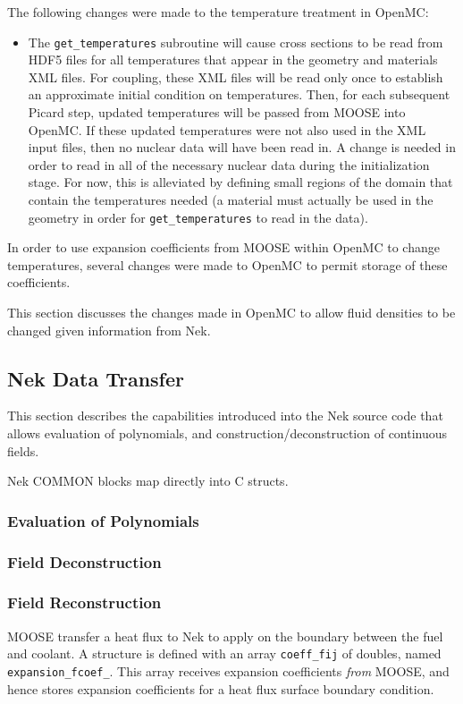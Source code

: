 \documentclass[10pt]{article}
\newcounter{subsubsubsection}[subsubsection]
\numberwithin{equation}{section} %
\begin{document}
The following changes were made to the temperature treatment in OpenMC:

\begin{itemize}
\item The {\tt get\_temperatures} subroutine will cause cross sections to be read from HDF5 files for all temperatures that appear in the geometry and materials XML files. For coupling, these XML files will be read only once to establish an approximate initial condition on temperatures. Then, for each subsequent Picard step, updated temperatures will be passed from MOOSE into OpenMC. If these updated temperatures were not also used in the XML input files, then no nuclear data will have been read in. A change is needed in order to read in all of the necessary nuclear data during the initialization stage. For now, this is alleviated by defining small regions of the domain that contain the temperatures needed (a material must actually be used in the geometry in order for {\tt get\_temperatures} to read in the data).
\end{itemize}

In order to use expansion coefficients from MOOSE within OpenMC to change temperatures, several changes were made to OpenMC to permit storage of these coefficients. 

This section discusses the changes made in OpenMC to allow fluid densities to be changed given information from Nek. 

\subsection{Nek Data Transfer}
This section describes the capabilities introduced into the Nek source code that allows evaluation of polynomials, and construction/deconstruction of continuous fields. 

Nek COMMON blocks map directly into C structs. 

\subsubsection{Evaluation of Polynomials}
\subsubsection{Field Deconstruction}
\subsubsection{Field Reconstruction}
MOOSE transfer a heat flux to Nek to apply on the boundary between the fuel and coolant. A structure is defined with an array {\tt coeff\_fij} of doubles, named {\tt expansion\_fcoef\_}. This array receives expansion coefficients {\it from} MOOSE, and hence stores expansion coefficients for a heat flux surface boundary condition. 
\end{document}
